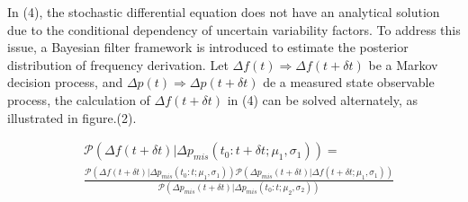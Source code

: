 \documentclass[lettersize,journal]{IEEEtran}
\newenvironment{newsubequations}{\small\begin{subequations}}{\end{subequations}}
\begin{document}
In (4), the stochastic differential equation does not have an analytical solution due to the conditional dependency of uncertain variability factors. To address this issue, a Bayesian filter framework is introduced to estimate the posterior distribution of frequency derivation. Let \(\varDelta f(t) \Rightarrow \varDelta f(t + \delta t)\) be a Markov decision process, and \(\varDelta p(t) \Rightarrow \varDelta p(t+\delta t)\) de a measured state observable process, the calculation of \(\varDelta f(t + \delta t)\) in (4) can be solved alternately, as illustrated in figure.(2).


\begin{newsubequations}
	\begin{align}
		 & \mathcal{P}(\varDelta f(t+\delta t) | \varDelta p_{mis}(t_0: t+\delta t; \mu_1,\sigma_1))=                                                                                                                                                                            \\
		 & \frac{\mathcal{P}(\varDelta f(t+\delta t) | \varDelta p_{mis}(t_0: t; \mu_1,\sigma_1)) \mathcal{P}(\varDelta p_{mis}(t+\delta  t) | \varDelta f(t+\delta t; \mu_1,\sigma_1))}{\mathcal{P}(\varDelta p_{mis}(t+\delta t) | \varDelta p_{mis}(t_0: t; \mu_2,\sigma_2))}
	\end{align}
\end{newsubequations}
\end{document}
